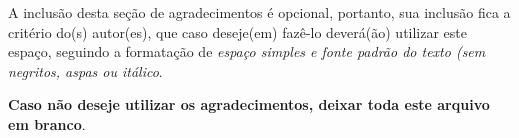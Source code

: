 \begin{agradecimentos}
A inclusão desta seção de agradecimentos é opcional, portanto, sua inclusão
fica a critério do(s) autor(es), que caso deseje(em) fazê-lo deverá(ão)
utilizar este espaço, seguindo a formatação de \textit{espaço simples e
fonte padrão do texto (sem negritos, aspas ou itálico}.

\textbf{Caso não deseje utilizar os agradecimentos, deixar toda este arquivo
em branco}.
\end{agradecimentos}
